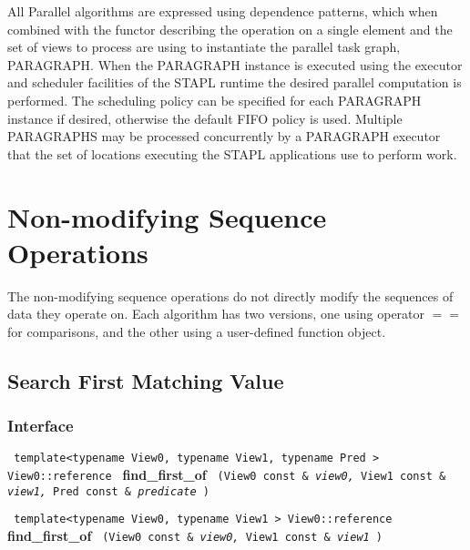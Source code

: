 All Parallel algorithms are expressed using dependence patterns, which when combined with the functor describing the operation on a single element and the set of views to process are using to instantiate the parallel task graph, PARAGRAPH. When the PARAGRAPH instance is executed using the executor and scheduler facilities of the STAPL runtime the desired parallel computation is performed. The scheduling policy can be specified for each PARAGRAPH instance if desired, otherwise the default FIFO policy is used. Multiple PARAGRAPHS may be processed concurrently by a PARAGRAPH executor that the set of locations executing the STAPL applications use to perform work.


\section{Non-modifying Sequence Operations} \label{sec-nonmod-alg}

The non-modifying sequence operations do not directly modify the sequences of data they operate on. Each algorithm has two versions, one using operator $==$ for comparisons, and the other using a user-defined function object.


\subsection{Search First Matching Value} \label{sec-srch-find_first}

\subsubsection{Interface} %

\noindent
\texttt{%
template<typename View0, typename View1, typename Pred >
\newline
View0::reference 
}
\newline
\textbf{find\_first\_of}%
\texttt{%
(View0 const \&
\textit{view0,}%
View1 const \&
\textit{view1,}%
Pred const \&
\textit{predicate}%
)
}
\vspace{0.4cm}
 
\noindent
\texttt{%
template<typename View0, typename View1 >
\newline
View0::reference 
}
\newline
\textbf{find\_first\_of}%
\texttt{%
(View0 const \&
\textit{view0,}%
View1 const \&
\textit{view1}%
)
}

